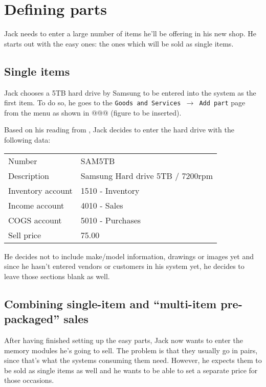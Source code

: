 \section{Defining parts}
\label{sec-stock-parts}

Jack needs to enter a large number of items he'll be offering in his new shop. He starts out
with the easy ones: the ones which will be sold as single items.

\subsection{Single items}
\label{subsec-stock-parts-single-item}

Jack chooses a 5TB hard drive by Samsung to be entered into the system as the first item.
To do so, he goes to the {\tt Goods and Services $\rightarrow$ Add part} page from the menu
as shown in @@@ (figure to be inserted).

Based on his reading from , Jack decides to enter the hard
drive with the following data:

\begin{tabular}{ll}
Number & SAM5TB \\
Description & Samsung Hard drive 5TB / 7200rpm \\
Inventory account & 1510 - Inventory\\
Income account & 4010 - Sales\\
COGS account & 5010 - Purchases\\
Sell price & 75.00
\end{tabular}

He decides not to include make/model information, drawings or images yet and since
he hasn't entered vendors or customers in his system yet, he decides to leave
those sections blank as well.

\subsection{Combining single-item and ``multi-item pre-packaged'' sales}
\label{subsec-stock-parts-mulit-item}

After having finished setting up the easy parts, Jack now wants to enter
the memory modules he's going to sell. The problem is that they usually go in pairs,
since that's what the systems consuming them need. However, he expects them to be sold
as single items as well and he wants to be able to set a separate price for those occasions.

